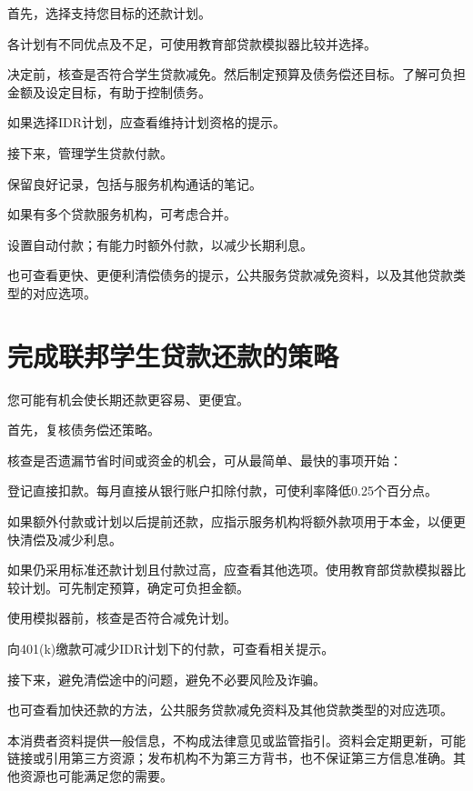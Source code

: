 \documentclass[UTF8,fontset=none,11pt,a4paper]{ctexart}
\begin{document}
首先，选择支持您目标的还款计划。


各计划有不同优点及不足，可使用教育部贷款模拟器比较并选择。


决定前，核查是否符合学生贷款减免。然后制定预算及债务偿还目标。了解可负担金额及设定目标，有助于控制债务。


如果选择IDR计划，应查看维持计划资格的提示。


接下来，管理学生贷款付款。


保留良好记录，包括与服务机构通话的笔记。


如果有多个贷款服务机构，可考虑合并。


设置自动付款；有能力时额外付款，以减少长期利息。


也可查看更快、更便利清偿债务的提示，公共服务贷款减免资料，以及其他贷款类型的对应选项。


\section*{完成联邦学生贷款还款的策略}
您可能有机会使长期还款更容易、更便宜。


首先，复核债务偿还策略。


核查是否遗漏节省时间或资金的机会，可从最简单、最快的事项开始：


登记直接扣款。每月直接从银行账户扣除付款，可使利率降低0.25个百分点。


如果额外付款或计划以后提前还款，应指示服务机构将额外款项用于本金，以便更快清偿及减少利息。


如果仍采用标准还款计划且付款过高，应查看其他选项。使用教育部贷款模拟器比较计划。可先制定预算，确定可负担金额。


使用模拟器前，核查是否符合减免计划。


向401(k)缴款可减少IDR计划下的付款，可查看相关提示。


接下来，避免清偿途中的问题，避免不必要风险及诈骗。


也可查看加快还款的方法，公共服务贷款减免资料及其他贷款类型的对应选项。


本消费者资料提供一般信息，不构成法律意见或监管指引。资料会定期更新，可能链接或引用第三方资源；发布机构不为第三方背书，也不保证第三方信息准确。其他资源也可能满足您的需要。
\end{document}
